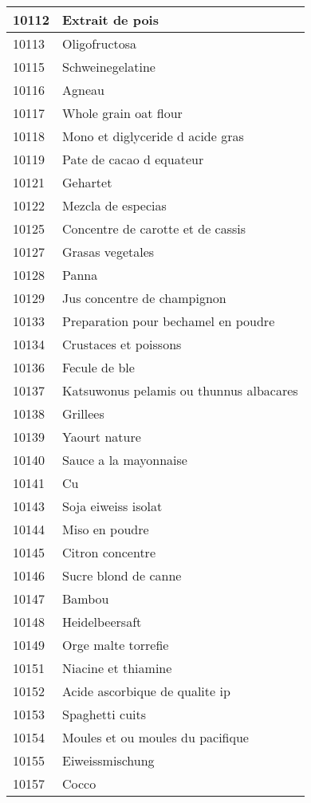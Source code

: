 \begin{longtable}{|l|l|}
10112 & Extrait de pois \\ \hline 
10113 & Oligofructosa \\ \hline 
10115 & Schweinegelatine \\ \hline 
10116 & Agneau \\ \hline 
10117 & Whole grain oat flour \\ \hline 
10118 & Mono et diglyceride d acide gras \\ \hline 
10119 & Pate de cacao d equateur \\ \hline 
10121 & Gehartet \\ \hline 
10122 & Mezcla de especias \\ \hline 
10125 & Concentre de carotte et de cassis \\ \hline 
10127 & Grasas vegetales \\ \hline 
10128 & Panna \\ \hline 
10129 & Jus concentre de champignon \\ \hline 
10133 & Preparation pour bechamel en poudre \\ \hline 
10134 & Crustaces et poissons \\ \hline 
10136 & Fecule de ble \\ \hline 
10137 & Katsuwonus pelamis ou thunnus albacares \\ \hline 
10138 & Grillees \\ \hline 
10139 & Yaourt nature \\ \hline 
10140 & Sauce a la mayonnaise \\ \hline 
10141 & Cu \\ \hline 
10143 & Soja eiweiss isolat \\ \hline 
10144 & Miso en poudre \\ \hline 
10145 & Citron concentre \\ \hline 
10146 & Sucre blond de canne \\ \hline 
10147 & Bambou \\ \hline 
10148 & Heidelbeersaft \\ \hline 
10149 & Orge malte torrefie \\ \hline 
10151 & Niacine et thiamine \\ \hline 
10152 & Acide ascorbique de qualite ip \\ \hline 
10153 & Spaghetti cuits \\ \hline 
10154 & Moules et ou moules du pacifique \\ \hline 
10155 & Eiweissmischung \\ \hline 
10157 & Cocco \\ \hline 

\end{longtable}
